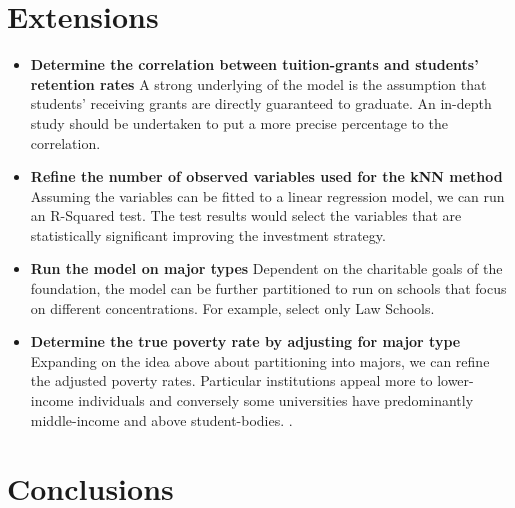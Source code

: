 \documentclass[12pt]{scrartcl}
\begin{document}
\section{Extensions}
	\begin{itemize}
		\item \textbf{Determine the correlation between tuition-grants and students' retention rates} A strong underlying of the model is the assumption that students' receiving grants are directly guaranteed to graduate. An in-depth study should be undertaken to put a more precise percentage to the correlation. 

		\item \textbf{Refine the number of observed variables used for the kNN method} Assuming the variables can be fitted to a linear regression model, we can run an R-Squared test. The test results would select the variables that are statistically significant improving the investment strategy. 

		\item \textbf{Run the model on major types} Dependent on the charitable goals of the foundation, the model can be further partitioned to run on schools that focus on different concentrations. For example, select only Law Schools. 

		\item \textbf{Determine the true poverty rate by adjusting for major type} Expanding on the idea above about partitioning into majors, we can refine the adjusted poverty rates. Particular institutions appeal more to lower-income individuals and conversely some universities have predominantly middle-income and above student-bodies. \cite{Carnevale}.
	\end{itemize}

\section{Conclusions}
\end{document}
